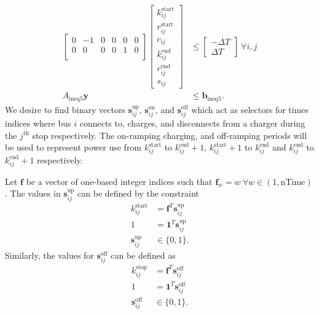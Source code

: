 \begin{equation} \begin{aligned}
	\begin{bmatrix} 0 & -1 & 0 & 0 & 0 & 0\\
		        0 &  0 & 0 & 0 & 1 & 0\\
	\end{bmatrix} 
	\begin{bmatrix} k_{ij}^{\text{start}} \\
		        r_{ij}^{\text{start}} \\
			c_{ij}                \\
			k_{ij}^{\text{end}}   \\
			r_{ij}^{\text{end}}   \\
			s_{ij}
	\end{bmatrix} &\le 
	\begin{bmatrix} -\Delta T \\
			\Delta T
	\end{bmatrix} \ \forall i,j \\ 
	A_{\text{ineq5}}\mathbf{y} &\le \mathbf{b}_{\text{ineq5}}.  
\end{aligned} \end{equation}
We desire to find binary vectors $\mathbf{s}^{\text{up}}_{ij}$, $\mathbf{s}^{\text{on}}_{ij}$, and $\mathbf{s}^{\text{off}}_{ij}$ which act as selectors for times indices where bus $i$ connects to, charges, and disconnects from a charger during the $j^{\text{th}}$ stop respectively. The on-ramping charging, and off-ramping periods will be used to represent power use from $k^{\text{start}}_{ij}$ to $k^{\text{end}}_{ij} + 1$, $k^{\text{start}}_{ij} + 1$ to $k^{\text{end}}_{ij}$ and $k^{\text{end}}_{ij}$ to $k^{\text{end}}_{ij} + 1$ respectively. 
\par Let $\mathbf{f}$ be a vector of one-based integer indices such that $\mathbf{f}_w = w \ \forall w \in (1,\text{nTime})$. The values in $\mathbf{s}^{\text{up}}_{ij}$ can be defined by the constraint
\begin{equation}\label{eqn:idxStart}\begin{aligned}
	k^{\text{start}}_{ij} &= \mathbf{f}^T\mathbf{s}^{\text{up}}_{ij} \\
	1 &= \mathbf{1}^T\mathbf{s}^{\text{up}}_{ij} \\
	\mathbf{s}^{\text{up}}_{ij} &\in \{0,1\}.
\end{aligned} \end{equation}
Similarly, the values for $\mathbf{s}^{\text{off}}_{ij}$ can be defined as
\begin{equation} \label{eqn:idxEnd}\begin{aligned}
	k^{\text{stop}}_{ij} &= \mathbf{f}^T\mathbf{s}^{\text{off}}_{ij}\\ 
	1 &= \mathbf{1}^T\mathbf{s}^{\text{off}}_{ij} \\
	\mathbf{s}^{\text{off}}_{ij} &\in \{0,1\}.
\end{aligned} \end{equation}

